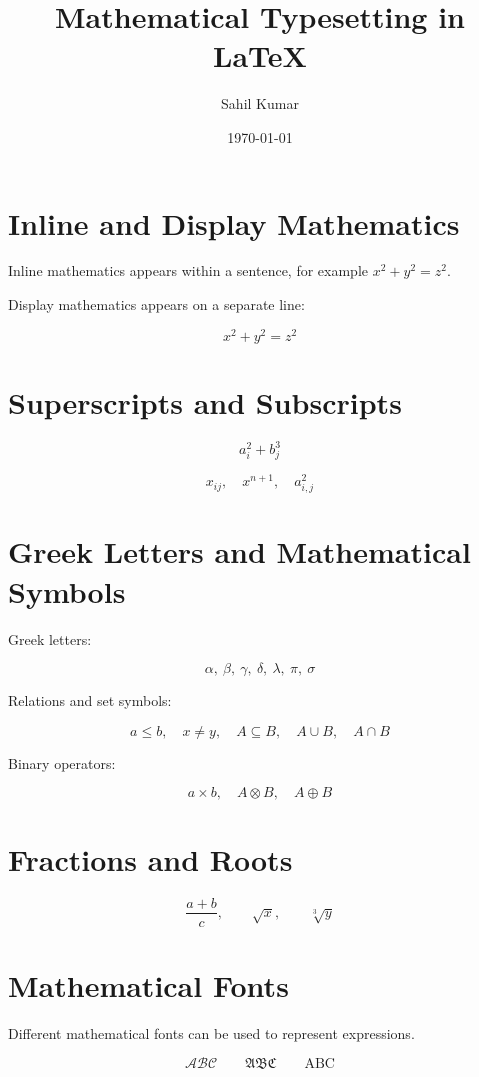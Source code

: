 \documentclass{article}
\title{Mathematical Typesetting in LaTeX}
\author{Sahil Kumar}
\date{\today}
\begin{document}
\maketitle

\section{Inline and Display Mathematics}

Inline mathematics appears within a sentence, for example
\(x^2 + y^2 = z^2\).

Display mathematics appears on a separate line:

\[
x^2 + y^2 = z^2
\]

\section{Superscripts and Subscripts}

\[
a_i^2 + b_j^3
\]

\[
x_{ij}, \quad x^{n+1}, \quad a_{i,j}^{2}
\]

\section{Greek Letters and Mathematical Symbols}

Greek letters:

\[
\alpha,\ \beta,\ \gamma,\ \delta,\ \lambda,\ \pi,\ \sigma
\]

Relations and set symbols:

\[
a \leq b,\quad x \neq y,\quad
A \subseteq B,\quad A \cup B,\quad A \cap B
\]

Binary operators:

\[
a \times b,\quad A \otimes B,\quad A \oplus B
\]

\section{Fractions and Roots}

\[
\frac{a+b}{c}, \qquad
\sqrt{x}, \qquad
\sqrt[3]{y}
\]

\section{Mathematical Fonts}

Different mathematical fonts can be used to represent expressions.

\[
\mathcal{ABC} \qquad
\mathfrak{ABC} \qquad
\mathrm{ABC}
\]
\end{document}
